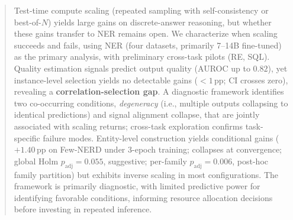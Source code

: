 \begin{abstract}
Test-time compute scaling (repeated sampling with self-consistency or best-of-$N$) yields large gains on discrete-answer reasoning, but whether these gains transfer to NER remains open.
We characterize when scaling succeeds and fails, using NER (four datasets, primarily 7--14B fine-tuned) as the primary analysis, with preliminary cross-task pilots (RE, SQL).
Quality estimation signals predict output quality (AUROC up to $0.82$), yet instance-level selection yields no detectable gains (${<}1$\,pp; CI crosses zero), revealing a \textbf{correlation-selection gap}.
A diagnostic framework identifies two co-occurring conditions, \textit{degeneracy} (i.e., multiple outputs collapsing to identical predictions) and signal alignment collapse, that are jointly associated with scaling returns; cross-task exploration confirms task-specific failure modes.
Entity-level construction yields conditional gains ($+1.40$\,pp on Few-NERD under 3-epoch training; collapses at convergence; global Holm $p_{\text{adj}}{=}0.055$, suggestive; per-family $p_{\text{adj}}{=}0.006$, post-hoc family partition) but exhibits inverse scaling in most configurations.
The framework is primarily diagnostic, with limited predictive power for identifying favorable conditions, informing resource allocation decisions before investing in repeated inference.
\end{abstract}
